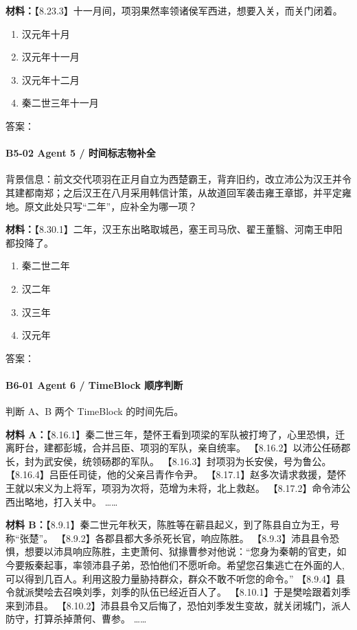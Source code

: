 \documentclass[fontset=none,11pt,a4paper]{ctexart}
\newcommand{\answerline}[1]{\underline{\hspace{#1}}}
\begin{document}
\textbf{材料：}【8.23.3】十一月间，项羽果然率领诸侯军西进，想要入关，而关门闭着。


\begin{enumerate}[label=\Alph*.]
  \item 汉元年十月
  \item 汉元年十一月
  \item 汉元年十二月
  \item 秦二世三年十一月
\end{enumerate}
答案：\answerline{2.2cm}

\paragraph{B5-02 \quad Agent 5 / 时间标志物补全}
背景信息：前文交代项羽在正月自立为西楚霸王，背弃旧约，改立沛公为汉王并令其建都南郑；之后汉王在八月采用韩信计策，从故道回军袭击雍王章邯，并平定雍地。原文此处只写“二年”，应补全为哪一项？


\textbf{材料：}【8.30.1】二年，汉王东出略取城邑，塞王司马欣、翟王董翳、河南王申阳都投降了。


\begin{enumerate}[label=\Alph*.]
  \item 秦二世二年
  \item 汉二年
  \item 汉三年
  \item 汉元年
\end{enumerate}
答案：\answerline{2.2cm}

\paragraph{B6-01 \quad Agent 6 / TimeBlock 顺序判断}
判断 A、B 两个 TimeBlock 的时间先后。


\textbf{材料 A：}【8.16.1】秦二世三年，楚怀王看到项梁的军队被打垮了，心里恐惧，迁离盱台，建都彭城，合并吕臣、项羽的军队，亲自统率。 【8.16.2】以沛公任砀郡长，封为武安侯，统领砀郡的军队。 【8.16.3】封项羽为长安侯，号为鲁公。 【8.16.4】吕臣任司徒，他的父亲吕青作令尹。 【8.17.1】赵多次请求救援，楚怀王就以宋义为上将军，项羽为次将，范增为未将，北上救赵。 【8.17.2】命令沛公西出略地，打入关中。 ……

\textbf{材料 B：}【8.9.1】秦二世元年秋天，陈胜等在蕲县起义，到了陈县自立为王，号称“张楚”。 【8.9.2】各郡县都大多杀死长官，响应陈胜。 【8.9.3】沛县县令恐惧，想要以沛具响应陈胜，主吏萧何、狱掾曹参对他说：“您身为秦朝的官吏，如今要叛秦起事，率领沛县子弟，恐怕他们不愿听命。希望您召集逃亡在外面的人,可以得到几百人。利用这股力量胁持群众，群众不敢不听您的命令。” 【8.9.4】县令就派樊哙去召唤刘季，刘季的队伍已经近百人了。 【8.10.1】于是樊哙跟着刘季来到沛县。 【8.10.2】沛县县令又后悔了，恐怕刘季发生变故，就关闭城门，派人防守，打算杀掉萧何、曹参。 ……
\end{document}
